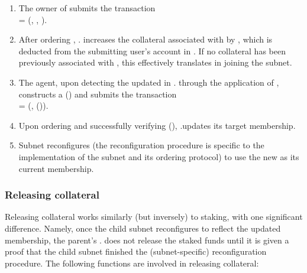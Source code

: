 \begin{enumerate}

    \item The owner of  submits the transaction\\
     = (, , ).

    \item After ordering , . increases the collateral associated with  by ,
    which is deducted from the submitting user's account in .
    If no collateral has been previously associated with , this effectively translates in  joining the subnet.

    \item \label{item:update-membership} The \ipc agent, upon detecting the updated  in . through the application of ,
    constructs a {\pof}() and submits the transaction\\
     = (, {\pof}()).

    \item Upon ordering  and successfully verifying {\pof}(), .\gw updates its target membership.

    \item Subnet  reconfigures (the reconfiguration procedure is specific to the implementation of the subnet and its ordering protocol)
    to use the new  as its current membership.
    
\end{enumerate}

\subsubsection{Releasing collateral}

Releasing collateral works similarly (but inversely) to staking, with one significant difference.
Namely, once the child subnet  reconfigures to reflect the updated membership, the parent's \saFull {}. does not release the staked funds
until it is given a proof that the child subnet  finished the (subnet-specific) reconfiguration procedure.
The following functions are involved in releasing collateral:

